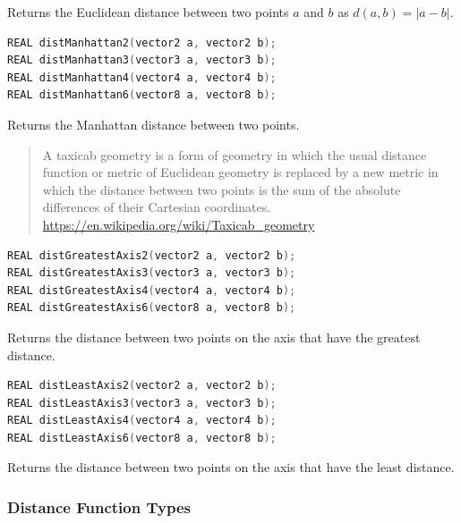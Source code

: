 Returns the Euclidean distance between two points $a$ and $b$ as $d(a,b) = |a-b|$.

\begin{lstlisting}[caption={Definition of Manhattan distance functions},label={lst:distance_manhattan_functions},language=OpenCL]
REAL distManhattan2(vector2 a, vector2 b);
REAL distManhattan3(vector3 a, vector3 b);
REAL distManhattan4(vector4 a, vector4 b);
REAL distManhattan6(vector8 a, vector8 b);
\end{lstlisting}

Returns the Manhattan distance between two points.

\begin{quote}
A taxicab geometry is a form of geometry in which the usual distance function or metric of Euclidean geometry is replaced by a new metric in which the distance between two points is the sum of the absolute differences of their Cartesian coordinates.
\url{https://en.wikipedia.org/wiki/Taxicab_geometry}
\end{quote}

\begin{lstlisting}[caption={Definition of greatest axis distance functions},label={lst:distance_greatest_axis_functions},language=OpenCL]
REAL distGreatestAxis2(vector2 a, vector2 b);
REAL distGreatestAxis3(vector3 a, vector3 b);
REAL distGreatestAxis4(vector4 a, vector4 b);
REAL distGreatestAxis6(vector8 a, vector8 b);
\end{lstlisting}

Returns the distance between two points on the axis that have the greatest distance.

\begin{lstlisting}[caption={Definition of least axis distance functions},label={lst:distance_least_axis_functions},language=OpenCL]
REAL distLeastAxis2(vector2 a, vector2 b);
REAL distLeastAxis3(vector3 a, vector3 b);
REAL distLeastAxis4(vector4 a, vector4 b);
REAL distLeastAxis6(vector8 a, vector8 b);
\end{lstlisting}

Returns the distance between two points on the axis that have the least distance.

\subsubsection{Distance Function Types}

